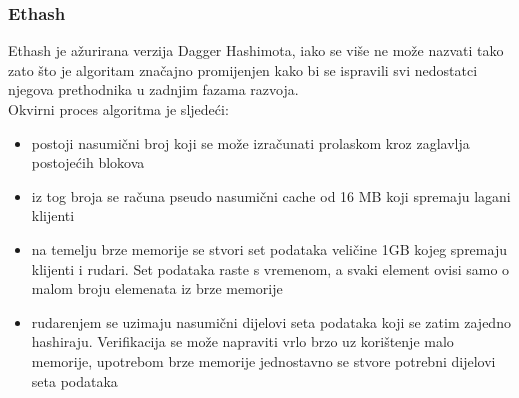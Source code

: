 \documentclass[12pt]{article}
\begin{document}
\subsubsection{Ethash}
Ethash je ažurirana verzija Dagger Hashimota, iako se više ne može nazvati tako zato što je algoritam značajno promijenjen kako bi se ispravili svi nedostatci njegova prethodnika u zadnjim fazama razvoja.\\
Okvirni proces algoritma je sljedeći:
\begin{itemize}
	\item postoji nasumični broj koji se može izračunati prolaskom kroz zaglavlja postojećih blokova 
	\item iz tog broja se računa pseudo nasumični cache od 16 MB koji spremaju lagani klijenti
	\item na temelju brze memorije se stvori set podataka veličine 1GB kojeg spremaju klijenti i rudari. Set podataka raste s vremenom, a svaki element ovisi samo o malom broju elemenata iz brze memorije
	\item rudarenjem se uzimaju nasumični dijelovi seta podataka koji se zatim zajedno hashiraju. Verifikacija se može napraviti vrlo brzo uz korištenje malo memorije, upotrebom brze memorije jednostavno se stvore potrebni dijelovi seta podataka\cite{ethash}
\end{itemize}
%
\end{document}
